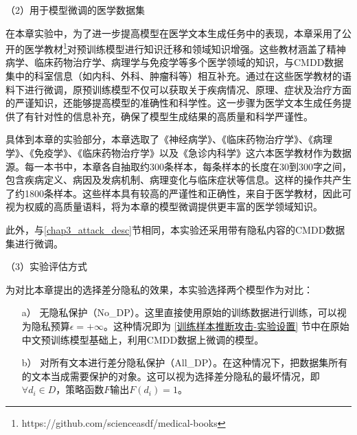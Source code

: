 
（2）用于模型微调的医学数据集

在本章实验中，为了进一步提高模型在医学文本生成任务中的表现，本章采用了公开的医学教材\footnote{https://github.com/scienceasdf/medical-books}对预训练模型进行知识迁移和领域知识增强。这些教材涵盖了精神病学、临床药物治疗学、病理学与免疫学等多个医学领域的知识，与CMDD数据集中的科室信息（如内科、外科、肿瘤科等）相互补充。通过在这些医学教材的语料下进行微调，原预训练模型不仅可以获取关于疾病情况、原理、症状及治疗方面的严谨知识，还能够提高模型的准确性和科学性。这一步骤为医学文本生成任务提供了有针对性的信息补充，确保了模型生成结果的高质量和科学严谨性。

具体到本章的实验部分，本章选取了《神经病学》、《临床药物治疗学》、《病理学》、《免疫学》、《临床药物治疗学》以及《急诊内科学》这六本医学教材作为数据源。每一本书中，本章各自抽取约300条样本，每条样本的长度在30到300字之间，包含疾病定义、病因及发病机制、病理变化与临床症状等信息。这样的操作共产生了约1800条样本。这些样本具有较高的严谨性和正确性，来自于医学教材，因此可视为权威的高质量语料，将为本章的模型微调提供更丰富的医学领域知识。

此外，与\ref{chap3_attack_desc}节相同，本实验还采用带有隐私内容的CMDD数据集进行微调。

（3）实验评估方式

为对比本章提出的选择差分隐私的效果，本实验选择两个模型作为对比：
\begin{itemize}
	\item [a）]
	无隐私保护（No\_DP）。这里直接使用原始的训练数据进行训练，可以视为隐私预算$\epsilon=+\infty$。这种情况即为 \ref{训练样本推断攻击-实验设置} 节中在原始中文预训练模型基础上，利用CMDD数据上微调的模型。
	\item [b）]
	对所有文本进行差分隐私保护（All\_DP）。在这种情况下，把数据集所有的文本当成需要保护的对象。这可以视为选择差分隐私的最坏情况，即$\forall d_i\in D$，策略函数$F$输出$F(d_i)=1$。
	
\end{itemize}

